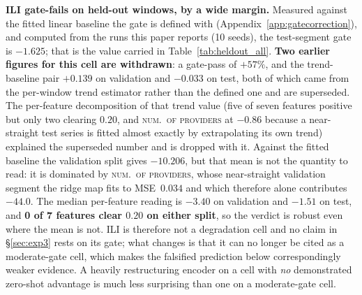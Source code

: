 \textbf{ILI gate-fails on held-out windows, by a wide margin.}
Measured against the fitted linear baseline the gate is defined with
(Appendix~\ref{app:gatecorrection}), and computed from the runs this paper
reports (10 seeds), the test-segment gate is $\mathbf{-1.625}$; that is the
value carried in Table~\ref{tab:heldout_all}. \textbf{Two earlier figures for
this cell are withdrawn}: a gate-pass of ${+}57\%$, and the trend-baseline pair
$+0.139$ on validation and $-0.033$ on test, both of which came from the
per-window trend estimator rather than the defined one and are superseded. The
per-feature decomposition of that trend value (five of seven features positive
but only two clearing $0.20$, and \textsc{num.\ of providers} at $-0.86$
because a near-straight test series is fitted almost exactly by extrapolating
its own trend) explained the superseded number and is dropped with it.
Against the fitted baseline the validation split gives $-10.206$, but that mean
is not the quantity to read: it is dominated by \textsc{num.\ of providers},
whose near-straight validation segment the ridge map fits to
MSE~$0.034$ and which therefore alone contributes $-44.0$. The median
per-feature reading is $-3.40$ on validation and $-1.51$ on test, and
\textbf{0 of 7 features clear $0.20$ on either split}, so the verdict is robust
even where the mean is not.
ILI is therefore not a degradation cell and no claim in
\S\ref{sec:exp3} rests on its gate; what changes is that it can no longer
be cited as a moderate-gate cell, which makes the falsified prediction below
correspondingly weaker evidence. A heavily restructuring encoder on a cell
with \emph{no} demonstrated zero-shot advantage is much less surprising than
one on a moderate-gate cell.

